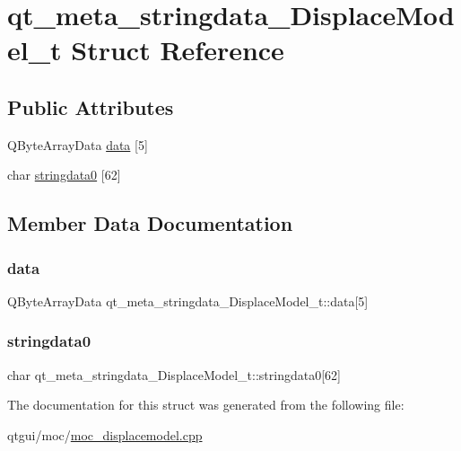 \hypertarget{structqt__meta__stringdata___displace_model__t}{}\section{qt\+\_\+meta\+\_\+stringdata\+\_\+\+Displace\+Model\+\_\+t Struct Reference}
\label{structqt__meta__stringdata___displace_model__t}
\subsection*{Public Attributes}
\begin{DoxyCompactItemize}
\item 
Q\+Byte\+Array\+Data \mbox{\hyperlink{structqt__meta__stringdata___displace_model__t_ad1d2a91db5bb934b372f8ef3f7e3860f}{data}} \mbox{[}5\mbox{]}
\item 
char \mbox{\hyperlink{structqt__meta__stringdata___displace_model__t_a1637f8edf5fbe6cb1e926c917d0f0eb9}{stringdata0}} \mbox{[}62\mbox{]}
\end{DoxyCompactItemize}


\subsection{Member Data Documentation}
\mbox{\label{structqt__meta__stringdata___displace_model__t_ad1d2a91db5bb934b372f8ef3f7e3860f}} 
\subsubsection{\texorpdfstring{data}{data}}
{\footnotesize\ttfamily Q\+Byte\+Array\+Data qt\+\_\+meta\+\_\+stringdata\+\_\+\+Displace\+Model\+\_\+t\+::data\mbox{[}5\mbox{]}}

\mbox{\label{structqt__meta__stringdata___displace_model__t_a1637f8edf5fbe6cb1e926c917d0f0eb9}} 
\subsubsection{\texorpdfstring{stringdata0}{stringdata0}}
{\footnotesize\ttfamily char qt\+\_\+meta\+\_\+stringdata\+\_\+\+Displace\+Model\+\_\+t\+::stringdata0\mbox{[}62\mbox{]}}



The documentation for this struct was generated from the following file\+:\begin{DoxyCompactItemize}
\item 
qtgui/moc/\mbox{\hyperlink{moc__displacemodel_8cpp}{moc\+\_\+displacemodel.\+cpp}}\end{DoxyCompactItemize}
